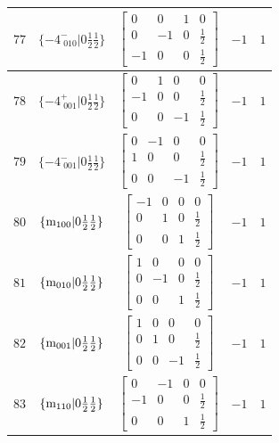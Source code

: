 \documentclass[fleqn,8pt]{jsarticle}
\begin{document}
\begin{longtable}{ccccc}
$ 77 $ & $ \{-4^{-}_{\,\,010}|0 \frac{1}{2} \frac{1}{2}\} $ & $ \begin{bmatrix} 0 & 0 & 1 & 0 \\ 0 & -1 & 0 & \frac{1}{2} \\ -1 & 0 & 0 & \frac{1}{2} \end{bmatrix} $ & $ -1 $ & $ 1 $ \\ \hline
$ 78 $ & $ \{-4^{+}_{\,\,001}|0 \frac{1}{2} \frac{1}{2}\} $ & $ \begin{bmatrix} 0 & 1 & 0 & 0 \\ -1 & 0 & 0 & \frac{1}{2} \\ 0 & 0 & -1 & \frac{1}{2} \end{bmatrix} $ & $ -1 $ & $ 1 $ \\ \hline
$ 79 $ & $ \{-4^{-}_{\,\,001}|0 \frac{1}{2} \frac{1}{2}\} $ & $ \begin{bmatrix} 0 & -1 & 0 & 0 \\ 1 & 0 & 0 & \frac{1}{2} \\ 0 & 0 & -1 & \frac{1}{2} \end{bmatrix} $ & $ -1 $ & $ 1 $ \\ \hline
$ 80 $ & $ \{{\rm m}_{100}|0 \frac{1}{2} \frac{1}{2}\} $ & $ \begin{bmatrix} -1 & 0 & 0 & 0 \\ 0 & 1 & 0 & \frac{1}{2} \\ 0 & 0 & 1 & \frac{1}{2} \end{bmatrix} $ & $ -1 $ & $ 1 $ \\ \hline
$ 81 $ & $ \{{\rm m}_{010}|0 \frac{1}{2} \frac{1}{2}\} $ & $ \begin{bmatrix} 1 & 0 & 0 & 0 \\ 0 & -1 & 0 & \frac{1}{2} \\ 0 & 0 & 1 & \frac{1}{2} \end{bmatrix} $ & $ -1 $ & $ 1 $ \\ \hline
$ 82 $ & $ \{{\rm m}_{001}|0 \frac{1}{2} \frac{1}{2}\} $ & $ \begin{bmatrix} 1 & 0 & 0 & 0 \\ 0 & 1 & 0 & \frac{1}{2} \\ 0 & 0 & -1 & \frac{1}{2} \end{bmatrix} $ & $ -1 $ & $ 1 $ \\ \hline
$ 83 $ & $ \{{\rm m}_{110}|0 \frac{1}{2} \frac{1}{2}\} $ & $ \begin{bmatrix} 0 & -1 & 0 & 0 \\ -1 & 0 & 0 & \frac{1}{2} \\ 0 & 0 & 1 & \frac{1}{2} \end{bmatrix} $ & $ -1 $ & $ 1 $ \\ \hline

\end{longtable}
\end{document}

